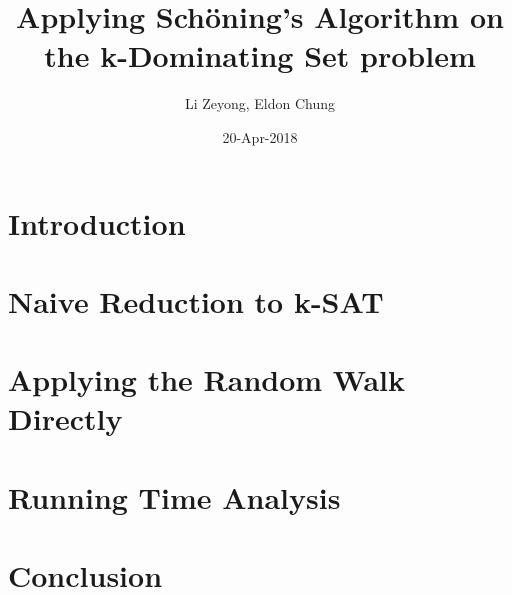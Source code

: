 \documentclass{article}
\title{Applying Sch\"{o}ning's Algorithm on the k-Dominating Set problem}
\author{Li Zeyong, Eldon Chung}
\date{20-Apr-2018}
\begin{document}
\maketitle

\section{Introduction}

\section{Naive Reduction to k-SAT}

\section{Applying the Random Walk Directly}

\section{Running Time Analysis}

\section{Conclusion}
\end{document}
